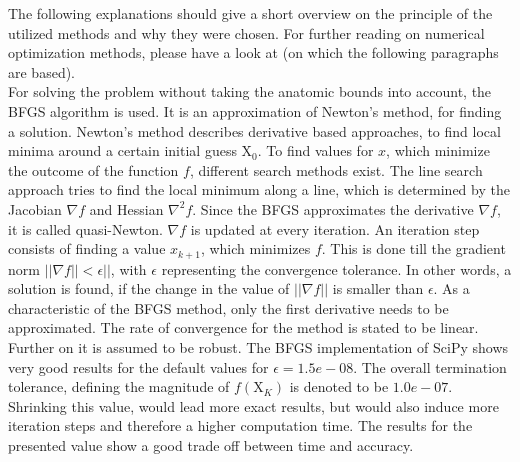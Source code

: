The following explanations should give a short overview on the principle of the utilized methods and why they were chosen. For further reading on numerical optimization methods, please have a look at \cite{nocedal2006numerical} (on which the following paragraphs are based).\\
For solving the problem without taking the anatomic bounds into account, the \ac{BFGS} algorithm is used. It is an approximation of Newton's method, for finding a solution. Newton's method describes derivative based approaches, to find local minima around a certain initial guess $ \mathrm{X}_{0} $. To find values for $ x $, which minimize the outcome of the function $ f $, different search methods exist. The line search approach tries to find the local minimum along a line, which is determined by the Jacobian $ \nabla f $ and Hessian $ \nabla^{2} f $. Since the \ac{BFGS} approximates the derivative  $ \nabla f $, it is called quasi-Newton. $ \nabla f $ is updated at every iteration. An iteration step consists of finding a value $ x_{k+1} $, which minimizes $ f $. This is done till the gradient norm $ || \nabla f|| < \epsilon ||$, with $ \epsilon $ representing the convergence tolerance. In other words, a solution is found, if the change in the value of $ ||\nabla f|| $ is smaller than $ \epsilon $. As a characteristic of the \ac{BFGS} method, only the first derivative needs to be approximated. The rate of convergence for the method is stated to be linear. Further on it is assumed to be robust. The \ac{BFGS} implementation of SciPy shows very good results for the default values for $ \epsilon = 1.5e-08 $. The overall termination tolerance, defining the magnitude of $ f(\mathrm{X}_K) $ is denoted to be $ 1.0e-07 $. Shrinking this value, would lead more exact results, but would also induce more iteration steps and therefore a higher computation time. The results for the presented value show a good trade off between time and accuracy.\\
